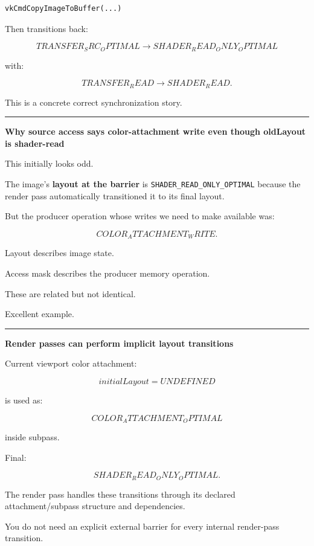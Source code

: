 \begin{verbatim}
vkCmdCopyImageToBuffer(...)
\end{verbatim}

Then transitions back:

\[
TRANSFER_SRC_OPTIMAL
\rightarrow
SHADER_READ_ONLY_OPTIMAL
\]

with:

\[
TRANSFER_READ
\rightarrow
SHADER_READ.
\]

This is a concrete correct synchronization story.

\begin{center}\rule{0.5\linewidth}{0.5pt}\end{center}

\textbf{Why source access says color-attachment write even though oldLayout is shader-read}

This initially looks odd.

The image's \textbf{layout at the barrier} is \texttt{SHADER\_READ\_ONLY\_OPTIMAL} because the render pass automatically transitioned it to its final layout.

But the producer operation whose writes we need to make available was:

\[
COLOR_ATTACHMENT_WRITE.
\]

Layout describes image state.

Access mask describes the producer memory operation.

These are related but not identical.

Excellent example.

\begin{center}\rule{0.5\linewidth}{0.5pt}\end{center}

\textbf{Render passes can perform implicit layout transitions}

Current viewport color attachment:

\[
initialLayout=UNDEFINED
\]

is used as:

\[
COLOR_ATTACHMENT_OPTIMAL
\]

inside subpass.

Final:

\[
SHADER_READ_ONLY_OPTIMAL.
\]

The render pass handles these transitions through its declared attachment/subpass structure and dependencies.

You do not need an explicit external barrier for every internal render-pass transition.

